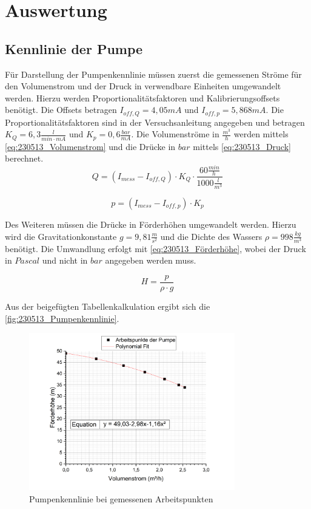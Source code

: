 \section{Auswertung}
\subsection{Kennlinie der Pumpe} \label{sec:230514_Kennlinie_der_Pumpe}
Für Darstellung der Pumpenkennlinie müssen zuerst die gemessenen Ströme für den Volumenstrom und der Druck in verwendbare Einheiten umgewandelt werden. 
Hierzu werden Proportionalitätsfaktoren und Kalibrierungsoffsets benötigt. 
Die Offsets betragen $I_{off,Q}=4,05 mA$ und $I_{off,p}=5,868 mA$.
Die Proportionalitätsfaktoren sind in der Versuchsanleitung angegeben und betragen $K_Q = 6,3 \frac{l}{min \cdot mA}$ und $K_p = 0,6 \frac{bar}{mA}$.
Die Volumenströme in $\frac{m^3}{h}$ werden mittels \autoref{eq:230513_Volumenstrom} und die Drücke in $bar$ mittels \autoref{eq:230513_Druck} berechnet.
\begin{equation}
  Q = (I_{mess}-I_{off,Q})\cdot K_Q \cdot \frac{60\frac{min}{h}}{1000\frac{l}{m^3}}
  \label{eq:230513_Volumenstrom}
\end{equation}

\begin{equation}
  p = (I_{mess}-I_{off,p})\cdot K_p
  \label{eq:230513_Druck}
\end{equation}

Des Weiteren müssen die Drücke in Förderhöhen umgewandelt werden. Hierzu wird die Gravitationkonstante $g = 9,81 \frac{m}{s^2}$ und die Dichte des Wassers $\rho = 998 \frac{kg}{m^3}$ benötigt.
Die Umwandlung erfolgt mit \autoref{eq:230513_Förderhöhe}, wobei der Druck in $Pascal$ und nicht in $bar$ angegeben werden muss.

\begin{equation}
  H = \frac{p}{\rho \cdot g}
  \label{eq:230513_Förderhöhe}
\end{equation}

Aus der beigefügten Tabellenkalkulation ergibt sich die \autoref{fig:230513_Pumpenkennlinie}.
\begin{figure}[H]
  \centering
  \includegraphics[width=0.8\textwidth]{Abbildungen/Pumpenkennlinie.png}
  \caption{Pumpenkennlinie bei gemessenen Arbeitspunkten}
  \label{fig:230513_Pumpenkennlinie}
\end{figure}

